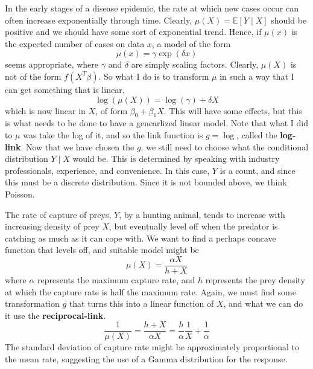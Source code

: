   \begin{example}
    In the early stages of a disease epidemic, the rate at which new cases occur can often increase exponentially through time. Clearly, $\mu(X) = \mathbb{E}[Y \mid X]$ should be positive and we should have some sort of exponential trend. Hence, if $\mu(x)$ is the expected number of cases on data $x$, a model of the form 
    \begin{equation}
      \mu(x) = \gamma \exp (\delta x)
    \end{equation}
    seems appropriate, where $\gamma$ and $\delta$ are simply scaling factors. Clearly, $\mu(X)$ is not of the form $f(X^T \beta)$. So what I do is to transform $\mu$ in such a way that I can get something that is linear. 
    \begin{equation}
      \log(\mu(X)) = \log(\gamma) + \delta X
    \end{equation}
    which is now linear in $X$, of form $\beta_0 + \beta_1 X$. This will have some effects, but this is what needs to be done to have a genearlized linear model. Note that what I did to $\mu$ was take the log of it, and so the link function is $g = \log$, called the \textbf{log-link}. Now that we have chosen the $g$, we still need to choose what the conditional distribution $Y \mid X$ would be. This is determined by speaking with industry professionals, experience, and convenience. In this case, $Y$ is a count, and since this must be a discrete distribution. Since it is not bounded above, we think Poisson. 
  \end{example}

  \begin{example}
    The rate of capture of preys, $Y$, by a hunting animal, tends to increase with increasing density of prey $X$, but eventually level off when the predator is catching as much as it can cope with. We want to find a perhaps concave function that levels off, and suitable model might be 
    \begin{equation}
      \mu(X) = \frac{\alpha X}{h + X}
    \end{equation}
    where $\alpha$ represents the maximum capture rate, and $h$ represents the prey density at which the capture rate is half the maximum rate. Again, we must find some transformation $g$ that turns this into a linear function of $X$, and what we can do it use the \textbf{reciprocal-link}. 
    \begin{equation}
      \frac{1}{\mu(X)} = \frac{h + X}{\alpha X} = \frac{h}{\alpha} \frac{1}{X} + \frac{1}{\alpha}
    \end{equation}
    The standard deviation of capture rate might be approximately proportional to the mean rate, suggesting the use of a Gamma distribution for the response. 
  \end{example}


